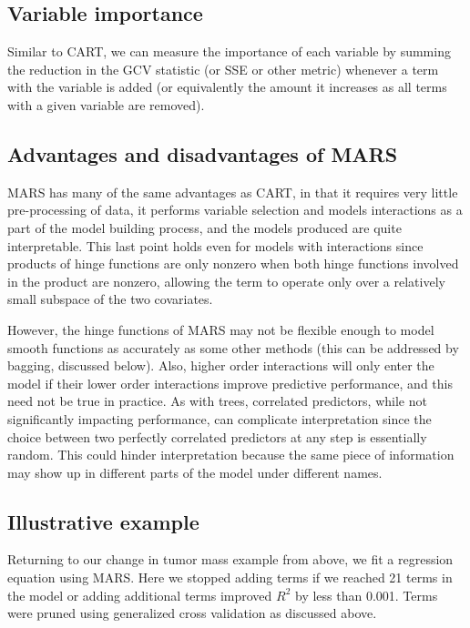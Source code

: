 \documentclass[12pt]{article}
\begin{document}
\subsection{Variable importance} %
\label{sub:variable_importance}

Similar to CART, we can measure the importance of each variable by summing the reduction in the GCV statistic (or SSE or other metric) whenever a term with the variable is added (or equivalently the amount it increases as all terms with a given variable are removed).


\subsection{Advantages and disadvantages of MARS} %
\label{sub:advantages_of_mars}

MARS has many of the same advantages as CART, in that it requires very little pre-processing of data, it performs variable selection and models interactions as a part of the model building process, and the models produced are quite interpretable. This last point holds even for models with interactions since products of hinge functions are only nonzero when both hinge functions involved in the product are nonzero, allowing the term to operate only over a relatively small subspace of the two covariates.

However, the hinge functions of MARS may not be flexible enough to model smooth functions as accurately as some other methods (this can be addressed by bagging, discussed below). Also, higher order interactions will only enter the model if their lower order interactions improve predictive performance, and this need not be true in practice. As with trees, correlated predictors, while not significantly impacting performance, can complicate interpretation since the choice between two perfectly correlated predictors at any step is essentially random. This could hinder interpretation because the same piece of information may show up in different parts of the model under different names.


\subsection{Illustrative example} %
\label{sub:mars-ex}

Returning to our change in tumor mass example from above, we fit a regression equation using MARS. Here we stopped adding terms if we reached 21 terms in the model or adding additional terms improved $R^2$ by less than 0.001. Terms were pruned using generalized cross validation as discussed above.
\end{document}
